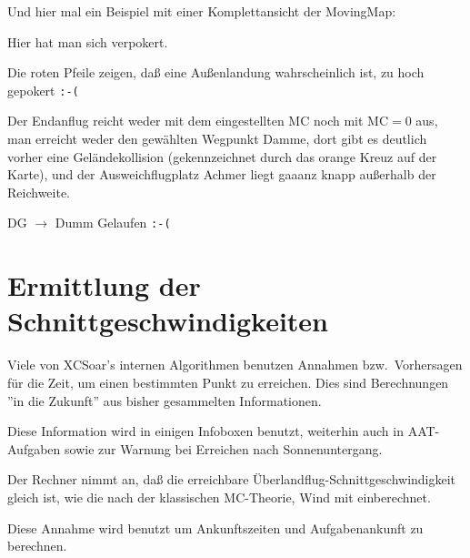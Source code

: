 Und hier mal ein Beispiel mit einer Komplettansicht der MovingMap:

\vspace{2em}
Hier hat man sich  verpokert. 


Die roten Pfeile zeigen, daß eine Außenlandung wahrscheinlich ist,  zu hoch gepokert \texttt{:-(}

Der Endanflug reicht weder mit dem eingestellten MC noch mit MC$=0$ aus, man erreicht weder den gewählten Wegpunkt \textsf{Damme}, dort gibt es deutlich vorher eine Geländekollision (gekennzeichnet durch das orange Kreuz auf der Karte), und der Ausweichflugplatz \textsf{Achmer} liegt gaaanz knapp außerhalb der Reichweite.

DG $\rightarrow$ Dumm Gelaufen \verb":-("

\vspace{2em}
\section{Ermittlung der Schnittgeschwindigkeiten}\label{sec:task-speed-estim}

Viele von \textsf{XCSoar's} internen Algorithmen benutzen Annahmen bzw.\ Vorhersagen für die Zeit, um
einen bestimmten Punkt zu erreichen. Dies sind Berechnungen ''in die Zukunft''  aus bisher 
gesammelten Informationen.

Diese Information wird in einigen Infoboxen benutzt, weiterhin auch in AAT-Aufgaben
sowie zur Warnung bei Erreichen nach Sonnenuntergang.

Der Rechner nimmt an, daß die erreichbare Überlandflug-Schnittgeschwindigkeit
gleich ist, wie die nach der klassischen MC-Theorie, Wind mit einberechnet.

Diese Annahme wird benutzt um Ankunftszeiten und Aufgabenankunft zu berechnen.

